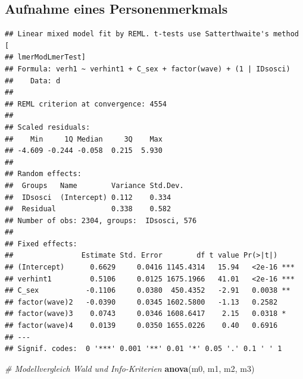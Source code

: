 \documentclass[
]{book}
\newenvironment{Shaded}{\begin{snugshade}}{\end{snugshade}}
\newcommand{\CommentTok}[1]{\textcolor[rgb]{0.56,0.35,0.01}{\textit{#1}}}
\newcommand{\DataTypeTok}[1]{\textcolor[rgb]{0.13,0.29,0.53}{#1}}
\newcommand{\DecValTok}[1]{\textcolor[rgb]{0.00,0.00,0.81}{#1}}
\newcommand{\KeywordTok}[1]{\textcolor[rgb]{0.13,0.29,0.53}{\textbf{#1}}}
\newcommand{\NormalTok}[1]{#1}
\newcommand{\OperatorTok}[1]{\textcolor[rgb]{0.81,0.36,0.00}{\textbf{#1}}}
\newcommand{\OtherTok}[1]{\textcolor[rgb]{0.56,0.35,0.01}{#1}}
\newcommand{\StringTok}[1]{\textcolor[rgb]{0.31,0.60,0.02}{#1}}
\begin{document}
\hypertarget{aufnahme-eines-personenmerkmals}{%
\subsection*{Aufnahme eines Personenmerkmals}\label{aufnahme-eines-personenmerkmals}}

\begin{Shaded}
\end{Shaded}

\begin{verbatim}
## Linear mixed model fit by REML. t-tests use Satterthwaite's method [
## lmerModLmerTest]
## Formula: verh1 ~ verhint1 + C_sex + factor(wave) + (1 | IDsosci)
##    Data: d
## 
## REML criterion at convergence: 4554
## 
## Scaled residuals: 
##    Min     1Q Median     3Q    Max 
## -4.609 -0.244 -0.058  0.215  5.930 
## 
## Random effects:
##  Groups   Name        Variance Std.Dev.
##  IDsosci  (Intercept) 0.112    0.334   
##  Residual             0.338    0.582   
## Number of obs: 2304, groups:  IDsosci, 576
## 
## Fixed effects:
##                Estimate Std. Error        df t value Pr(>|t|)    
## (Intercept)      0.6629     0.0416 1145.4314   15.94   <2e-16 ***
## verhint1         0.5106     0.0125 1675.1966   41.01   <2e-16 ***
## C_sex           -0.1106     0.0380  450.4352   -2.91   0.0038 ** 
## factor(wave)2   -0.0390     0.0345 1602.5800   -1.13   0.2582    
## factor(wave)3    0.0743     0.0346 1608.6417    2.15   0.0318 *  
## factor(wave)4    0.0139     0.0350 1655.0226    0.40   0.6916    
## ---
## Signif. codes:  0 '***' 0.001 '**' 0.01 '*' 0.05 '.' 0.1 ' ' 1
\end{verbatim}

\begin{Shaded}
\begin{Highlighting}[]
\CommentTok{# Modellvergleich Wald und Info-Kriterien}
\KeywordTok{anova}\NormalTok{(m0, m1, m2, m3)}
\end{Highlighting}
\end{Shaded}
\end{document}
